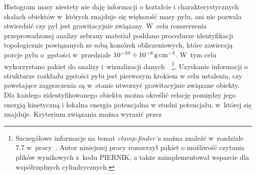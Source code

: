 %
\par Histogram masy niestety nie daję informacji o kształcie i
charakterystycznych skalach obiektów w~których znajduje się większość masy pyłu,
ani nie pozwala stwierdzić czy pył jest grawitacyjnie związany. W~celu
rozszerzenia przeprowadzonej analizy zebrany materiał poddano procedurze
identyfikacji topologicznie powiązanych ze sobą komórek obliczeniowych, które
zawierają porcje pyłu o~gęstości w~przedziale $10^{-10}\div10^{-8}\hbox{$\thinspace\textrm{g}$}\hbox{$\thinspace\textrm{cm}$}^{-3}$. W~tym
celu wykorzystano pakiet do analizy i~wizualizacji
danych~\yt{}~\footnote{Szczegółowe informacje na temat \emph{clump-finder'a}
można znaleźć w~rozdziale 7.7 w~pracy~\cite{yt}. Autor niniejszej pracy
rozszerzył pakiet \yt{} o możliwość czytania plików wynikowych z~kodu
PIERNIK, a także zaimplementował wsparcie dla współrzędnych cylindrycznych.}.
Uzyskanie informacji o strukturze rozkładu gęstości pyłu jest pierwszym krokiem w
celu ustalenia, czy powstające zagęszczenia są w~stanie utworzyć grawitacyjnie
związane obiekty. Dla każdego zidentyfikowanego obiektu można
określić relację pomiędzy jego energią kinetyczną i lokalna energia potencjalna
w studni potencjału, w~której się znajduje. Kryterium związania można wyrazić przez

